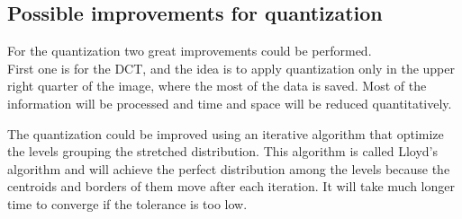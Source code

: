 \documentclass[a4paper, 10pt, conference] {article}
\begin{document}
 \subsection{Possible improvements for quantization}

For the quantization two great improvements could be performed.\\

First one is for the DCT, and the idea is to apply quantization only in the upper right quarter of the image, where the most of the data is saved. Most of the information will be processed and time and space will be reduced quantitatively. 

The quantization could be improved using an iterative algorithm that optimize the levels grouping the stretched distribution. This algorithm is called Lloyd's algorithm and will achieve the perfect distribution among the levels because the centroids and borders of them move after each iteration. It will take much longer time to converge if the tolerance is too low.
\end{document}
